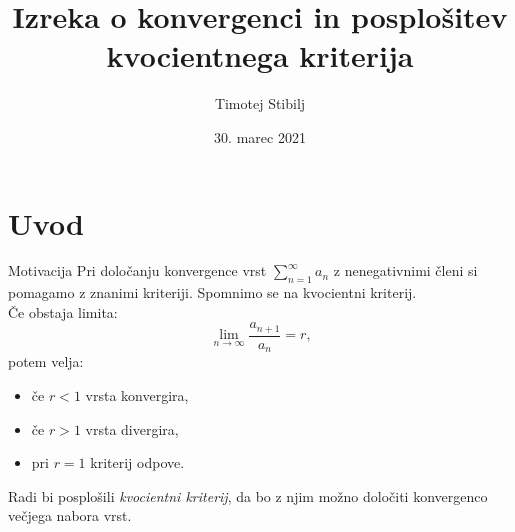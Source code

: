 \documentclass{beamer}
\begin{document}
\title{Izreka o konvergenci in posplošitev kvocientnega kriterija}
\author{Timotej Stibilj}
\date{30. marec 2021}

\begin{frame}
   \titlepage
\end{frame}
\section{Uvod}
\begin{frame}
    \begin{block}{Motivacija}
    Pri določanju konvergence vrst $\sum_{n = 1}^{\infty}{a_n}$ z nenegativnimi členi si pomagamo z znanimi kriteriji.
    Spomnimo se na kvocientni kriterij. \\
    Če obstaja limita:
    \[
       \lim_{n \to \infty} \frac{a_{n + 1}}{a_n} = r \text{,}
    \]
    potem velja: \\
         \begin{itemize}
             \item če $ r < 1 $ vrsta konvergira,
             \item če $r > 1$ vrsta divergira,
             \item pri $r = 1$ kriterij odpove.
         \end{itemize}
 
    Radi bi posplošili \emph{kvocientni kriterij}, da bo z njim možno določiti konvergenco večjega nabora vrst.  
    \end{block}
\end{frame}
\end{document}
